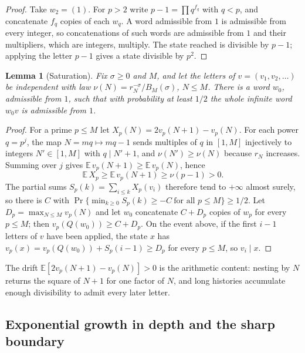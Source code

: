 \documentclass[11pt,a4paper]{article}
\newtheorem{lemma}[theorem]{Lemma}
\begin{document}
\begin{proof}

Take \(w_2=(1)\). For \(p>2\) write \(p-1=\prod q^{f_q}\) with \(q<p\),
and concatenate \(f_q\) copies of each \(w_q\). A word admissible from
\(1\) is admissible from every integer, so concatenations of such words
are admissible from \(1\) and their multipliers, which are integers,
multiply. The state reached is divisible by \(p-1\); applying the letter
\(p-1\) gives a state divisible by \(p^2\).

\end{proof}

\begin{lemma}[Saturation]\label{lem:saturation}
Fix \(\sigma\ge0\) and \(M\), and let the letters of
\(v=(v_1,v_2,\dots)\) be independent with law
\(\nu(N)=r_N^{-\sigma}/B_M(\sigma)\), \(N\le M\). There is a word
\(w_0\), admissible from \(1\), such that with probability at least
\(1/2\) the whole infinite word \(w_0v\) is admissible from \(1\).

\end{lemma}

\begin{proof}

For a prime \(p\le M\) let \(X_p(N)=2v_p(N+1)-v_p(N)\). For each power
\(q=p^j\), the map \(N=mq\mapsto mq-1\) sends multiples of \(q\) in
\([1,M]\) injectively to integers \(N'\in[1,M]\) with \(q\mid N'+1\),
and \(\nu(N')\ge\nu(N)\) because \(r_N\) increases. Summing over \(j\)
gives \(\mathbb E\,v_p(N+1)\ge\mathbb E\,v_p(N)\), hence
\[\mathbb E\,X_p\ge\mathbb E\,v_p(N+1)\ge\nu(p-1)>0 .\] The partial sums
\(S_p(k)=\sum_{i\le k}X_p(v_i)\) therefore tend to \(+\infty\) almost
surely, so there is \(C\) with
\(\Pr\{\min_{k\ge0}S_p(k)\ge-C\ \text{for all }p\le M\}\ge1/2\). Let
\(D_p=\max_{N\le M}v_p(N)\) and let \(w_0\) concatenate \(C+D_p\) copies
of \(w_p\) for every \(p\le M\); then \(v_p(Q(w_0))\ge C+D_p\). On the
event above, if the first \(i-1\) letters of \(v\) have been applied,
the state \(x\) has \(v_p(x)=v_p(Q(w_0))+S_p(i-1)\ge D_p\) for every
\(p\le M\), so \(v_i\mid x\).

\end{proof}

The drift \(\mathbb E[2v_p(N+1)-v_p(N)]>0\) is the arithmetic content:
nesting by \(N\) returns the square of \(N+1\) for one factor of \(N\),
and long histories accumulate enough divisibility to admit every later
letter.

\subsection{Exponential growth in depth and the sharp
boundary}
\end{document}
